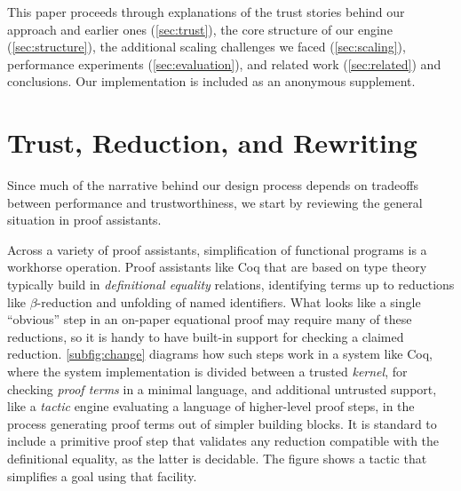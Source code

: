 \documentclass[sigplan,10pt,review,anonymous]{acmart}\settopmatter{printfolios=true,printccs=false,printacmref=false}
\begin{document}
This paper proceeds through explanations of the trust stories behind our approach and earlier ones (\autoref{sec:trust}), the core structure of our engine (\autoref{sec:structure}), the additional scaling challenges we faced (\autoref{sec:scaling}), performance experiments (\autoref{sec:evaluation}), and related work (\autoref{sec:related}) and conclusions.
Our implementation is included as an anonymous supplement.


\section{Trust, Reduction, and Rewriting} \label{sec:trust}

Since much of the narrative behind our design process depends on tradeoffs between performance and trustworthiness, we start by reviewing the general situation in proof assistants.

Across a variety of proof assistants, simplification of functional programs is a workhorse operation.
Proof assistants like Coq that are based on type theory typically build in \emph{definitional equality} relations, identifying terms up to reductions like $\beta$-reduction and unfolding of named identifiers.
What looks like a single ``obvious'' step in an on-paper equational proof may require many of these reductions, so it is handy to have built-in support for checking a claimed reduction.
\autoref{subfig:change} diagrams how such steps work in a system like Coq, where the system implementation is divided between a trusted \emph{kernel}, for checking \emph{proof terms} in a minimal language, and additional untrusted support, like a \emph{tactic} engine evaluating a language of higher-level proof steps, in the process generating proof terms out of simpler building blocks.
It is standard to include a primitive proof step that validates any reduction compatible with the definitional equality, as the latter is decidable.
The figure shows a tactic that simplifies a goal using that facility.
\end{document}
